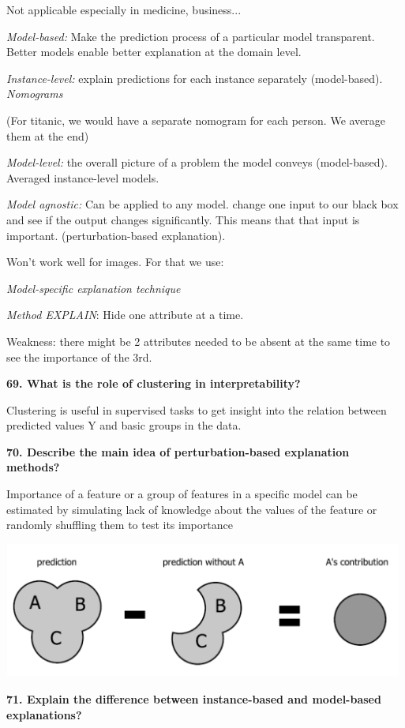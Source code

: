 Not applicable especially in medicine, business...

\textit{Model-based:} Make the prediction process of a particular
model transparent. Better models enable better explanation at the domain
level.

\textit{Instance-level:} explain predictions for each instance
separately (model-based). \emph{Nomograms}

(For titanic, we would have a separate nomogram for each person. We
average them at the end)

\textit{Model-level:} the overall picture of a problem the model
conveys (model-based). Averaged instance-level models.

\textit{Model agnostic:} Can be applied to any model. change one
input to our black box and see if the output changes significantly. This
means that that input is important. (perturbation-based explanation).

Won't work well for images. For that we use:

\textit{Model-specific explanation technique}

\textit{Method EXPLAIN}: Hide one attribute at a time.

Weakness: there might be 2 attributes needed to be absent at the same
time to see the importance of the 3rd.

\textbf{69. What is the role of clustering in interpretability?}

Clustering is useful in supervised tasks to get insight into the
relation between predicted values Y and basic groups in the data.

\textbf{70. Describe the main idea of perturbation-based explanation
methods?}

Importance of a feature or a group of features in a specific model can
be estimated by simulating lack of knowledge about the values of the
feature or randomly shuffling them to test its importance

\includegraphics[width=5.18229in,height=1.75613in]{media/image6.png}

\textbf{71. Explain the difference between instance-based and
model-based explanations?}

